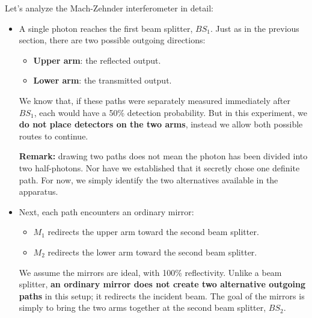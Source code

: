 \noindent
Let's analyze the Mach-Zehnder interferometer in detail:
\begin{itemize}
    \item {} A single photon reaches the first beam splitter, $BS_1$. Just as in the previous section, there are two possible outgoing directions:
        \begin{itemize}
            \item \textbf{Upper arm}: the reflected output.
            \item \textbf{Lower arm}: the transmitted output.
        \end{itemize}
        We know that, if these paths were separately measured immediately after ${BS}_1$, each would have a 50\% detection probability. But in this experiment, we \textbf{do not place detectors on the two arms}, instead we allow both possible routes to continue.

        \textcolor{DarkOrange3}{ \textbf{Remark:}} drawing two paths does not mean the photon has been divided into two half-photons. Nor have we established that it secretly chose one definite path. For now, we simply identify the two alternatives available in the apparatus.

    \item {} Next, each path encounters an ordinary mirror:
        \begin{itemize}
            \item $M_1$ redirects the upper arm toward the second beam splitter.
            \item $M_2$ redirects the lower arm toward the second beam splitter.
        \end{itemize}
        We assume the mirrors are ideal, with 100\% reflectivity. Unlike a beam splitter, \textbf{an ordinary mirror does not create two alternative outgoing paths} in this setup; it redirects the incident beam. The goal of the mirrors is simply to bring the two arms together at the second beam splitter, $BS_2$.


\end{itemize}
